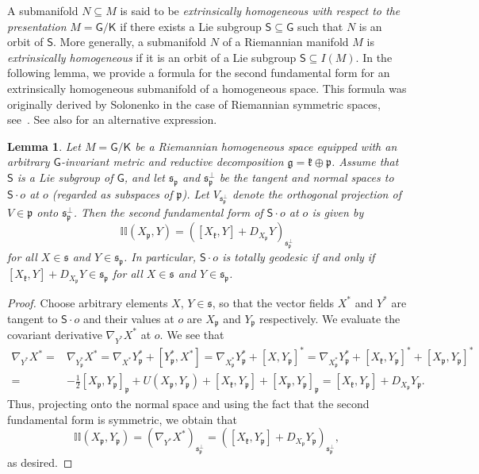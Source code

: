 \documentclass[11pt,a4paper,final]{amsart}
\newcommand{\s}{\mathsf}
\newcommand{\g}{\mathfrak}
\newtheorem{lemma}[theorem]{Lemma}
\theoremstyle{definition}
\begin{document}
A submanifold $N\subseteq M$ is said to be \textit{extrinsically homogeneous with respect to the presentation} $M=\s{G}/\s{K}$ if there exists a Lie subgroup $\s{S}\subseteq \s{G}$ such that $N$ is an orbit of $\s{S}$.
More generally, a submanifold $N$ of a Riemannian manifold $M$ is \textit{extrinsically homogeneous} if it is an orbit of a Lie subgroup $\s{S}\subseteq I(M)$.
In the following lemma, we provide a formula for the second fundamental form for an extrinsically homogeneous submanifold of a homogeneous space.
This formula was originally derived by Solonenko in the case of Riemannian symmetric spaces, see~\cite[Proposition~2.2.43]{Solonenko}.
See also \cite[Proposition~2.2]{AlekseevskyDiScala} for an alternative expression.
	
\begin{lemma}
	Let $M=\s{G}/\s{K}$ be a Riemannian homogeneous space equipped with an arbitrary $\s{G}$-invariant metric and reductive decomposition $\g{g}=\g{k}\oplus\g{p}$.
	Assume that $\s{S}$ is a Lie subgroup of $\s{G}$, and let $\g{s}_{\g{p}}$ and $\g{s}_{\g{p}}^{\perp}$ be the tangent and normal spaces to $\s{S}\cdot o$ at $o$ (regarded as subspaces of $\g{p}$).
	Let $V_{\g{s}_{\g{p}}^{\perp}}$ denote the orthogonal projection of $V\in\g{p}$ onto $\g{s}_{\g{p}}^{\perp}$.
	Then the second fundamental form of $\s{S}\cdot o$ at $o$ is given by
	\begin{equation}\label{eq:SecondFundamentalFormOrbit}
		\mathbb{II}(X_{\g{p}},Y)=([X_{\g{k}},Y]+D_{X_{\g{p}}}Y)_{\g{s}_{\g{p}}^{\perp}}
	\end{equation}
	for all $X\in\g{s}$ and $Y\in \g{s}_{\g{p}}$.
	In particular, $\s{S}\cdot o$ is totally geodesic if and only if $[X_{\g{k}},Y]+D_{X_{\g{p}}}Y\in \g{s}_{\g{p}}$ for all $X\in \g{s}$ and $Y\in\g{s}_{\g{p}}$.
	\end{lemma}
\begin{proof}
	Choose arbitrary elements $X$, $Y\in\g{s}$, so that the vector fields $X^{*}$ and $Y^{*}$ are tangent to $\s{S}\cdot o$ and their values at $o$ are $X_{\g{p}}$ and $Y_{\g{p}}$ respectively.
	We evaluate the covariant derivative $\nabla_{Y^{*}}X^{*}$ at $o$.
	We see that
	\[
	\begin{aligned}
		\nabla_{Y^{*}}X^{*}={}&\nabla_{Y_{\g{p}}^{*}}X^{*}=\nabla_{X^{*}}Y_{\g{p}}^{*}+[Y_{\g{p}}^{*},X^{*}]=\nabla_{X_{\g{p}}^{*}}Y_{\g{p}}^{*}+[X,Y_{\g{p}}]^{*}=\nabla_{X_{\g{p}}^{*}}Y_{\g{p}}^{*}+[X_{\g{k}},Y_{\g{p}}]^{*}+[X_{\g{p}},Y_{\g{p}}]^{*} \\
		={}&-\frac{1}{2}[X_{\g{p}},Y_{\g{p}}]_{\g{p}}+U(X_{\g{p}},Y_{\g{p}})+[X_{\g{k}},Y_{\g{p}}]+[X_{\g{p}},Y_{\g{p}}]_{\g{p}}=[X_{\g{k}},Y_{\g{p}}]+D_{X_{\g{p}}}Y_{\g{p}}.
	\end{aligned}
	\]
	Thus, projecting onto the normal space and using the fact that the second fundamental form is symmetric, we obtain that
	\[
	\mathbb{II}(X_{\g{p}},Y_{\g{p}})=(\nabla_{Y^{*}}X^{*})_{\g{s}_{\g{p}}^{\perp}}=([X_{\g{k}},Y_{\g{p}}]+D_{X_{\g{p}}}Y_{\g{p}})_{\g{s}_{\g{p}}^{\perp}},
	\]
	as desired. \qedhere
\end{proof}
	
\end{document}
